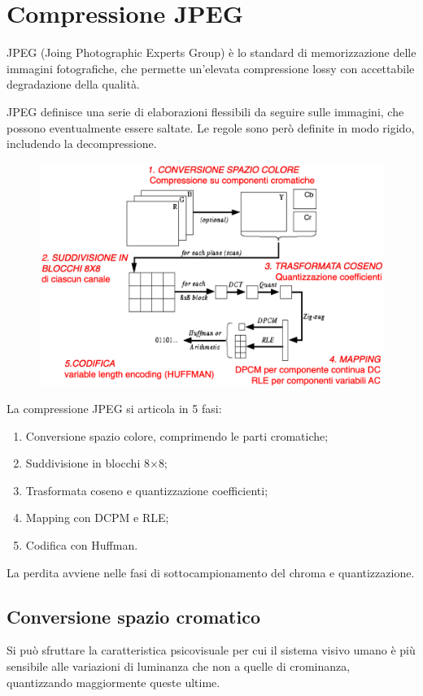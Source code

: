 \section{Compressione JPEG}
JPEG (Joing Photographic Experts Group) è lo standard di memorizzazione delle immagini fotografiche, che permette un'elevata compressione lossy con accettabile degradazione della qualità. 

JPEG definisce una serie di elaborazioni flessibili da seguire sulle immagini, che possono eventualmente essere saltate. Le regole sono però definite in modo rigido, includendo la decompressione.

\begin{figure}[h]
	\centering
	\includegraphics[scale=0.37]{Lezioni/Immagini/jpeg}
\end{figure}

La compressione JPEG si articola in 5 fasi:
\begin{enumerate}
	\item Conversione spazio colore, comprimendo le parti cromatiche;
	\item Suddivisione in blocchi 8$\times$8;
	\item Trasformata coseno e quantizzazione coefficienti;
	\item Mapping con DCPM e RLE;
	\item Codifica con Huffman.
\end{enumerate}
La perdita avviene nelle fasi di sottocampionamento del chroma e quantizzazione. 

\subsection{Conversione spazio cromatico}
Si può sfruttare la caratteristica psicovisuale per cui il sistema visivo umano è più sensibile alle variazioni di luminanza che non a quelle di crominanza, quantizzando maggiormente queste ultime.

